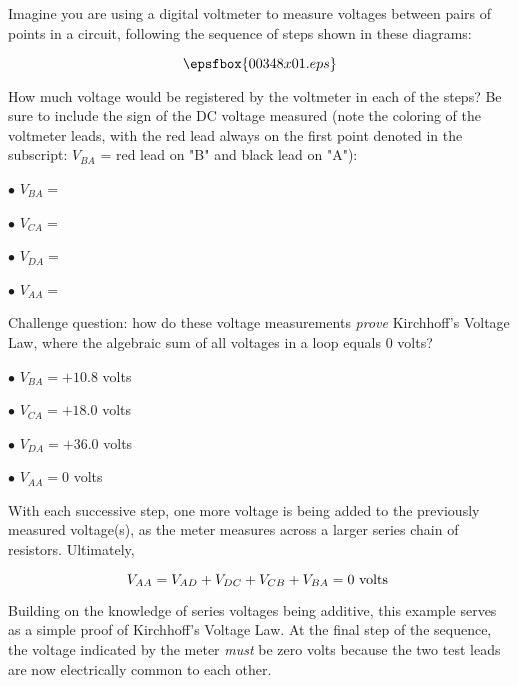 

Imagine you are using a digital voltmeter to measure voltages between pairs of points in a circuit, following the sequence of steps shown in these diagrams:

$$\epsfbox{00348x01.eps}$$

How much voltage would be registered by the voltmeter in each of the steps?  Be sure to include the sign of the DC voltage measured (note the coloring of the voltmeter leads, with the red lead always on the first point denoted in the subscript: $V_{BA}$ = red lead on "B" and black lead on "A"):

\medskip
\item{$\bullet$} $V_{BA} = $
\item{$\bullet$} $V_{CA} = $
\item{$\bullet$} $V_{DA} = $
\item{$\bullet$} $V_{AA} = $
\medskip

\vskip 10pt

Challenge question: how do these voltage measurements {\it prove} Kirchhoff's Voltage Law, where the algebraic sum of all voltages in a loop equals 0 volts?







\medskip
\item{$\bullet$} $V_{BA} = +10.8$ volts
\item{$\bullet$} $V_{CA} = +18.0$ volts
\item{$\bullet$} $V_{DA} = +36.0$ volts
\item{$\bullet$} $V_{AA} = 0$ volts
\medskip

With each successive step, one more voltage is being added to the previously measured voltage(s), as the meter measures across a larger series chain of resistors.  Ultimately, 

$$V_{AA} = V_{AD} + V_{DC} + V_{CB} + V_{BA} = 0 \hbox{ volts }$$







Building on the knowledge of series voltages being additive, this example serves as a simple proof of Kirchhoff's Voltage Law.  At the final step of the sequence, the voltage indicated by the meter {\it must} be zero volts because the two test leads are now electrically common to each other.




